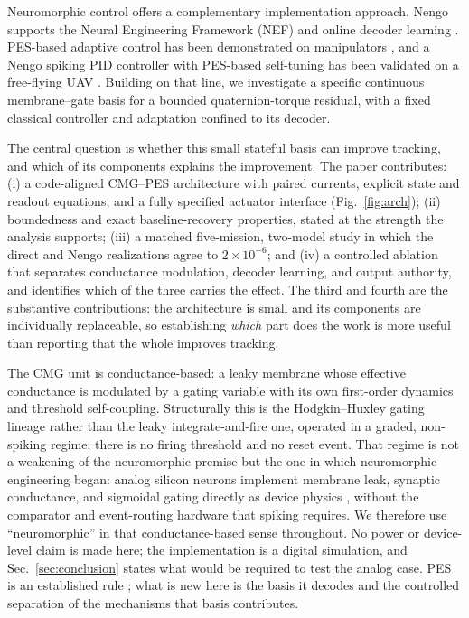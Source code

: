 \documentclass[letterpaper,10pt,conference]{IEEEtran}
\begin{document}
Neuromorphic control offers a complementary implementation approach.
Nengo supports the Neural Engineering Framework (NEF) and online decoder
learning \cite{bekolay2014nengo}. PES-based adaptive control has been
demonstrated on manipulators \cite{dewolf2016arm,dewolf2020nengo}, and a
Nengo spiking PID controller with PES-based self-tuning has been validated
on a free-flying UAV \cite{olivares2026selftuning}. Building on that line, we
investigate a specific continuous membrane--gate basis for a bounded
quaternion-torque residual, with a fixed classical controller and adaptation
confined to its decoder.

The central question is whether this small stateful basis can improve
tracking, and which of its components explains the improvement. The paper
contributes: (i) a code-aligned CMG--PES architecture with paired currents,
explicit state and readout equations, and a fully specified actuator
interface (Fig.~\ref{fig:arch}); (ii) boundedness and exact
baseline-recovery properties, stated at the strength the analysis supports;
(iii) a matched five-mission, two-model study in which the direct and Nengo
realizations agree to $2\times10^{-6}$; and (iv) a controlled ablation that
separates conductance modulation, decoder learning, and output authority,
and identifies which of the three carries the effect. The third and fourth
are the substantive contributions: the architecture is small and its
components are individually replaceable, so establishing \emph{which} part
does the work is more useful than reporting that the whole improves
tracking.

The CMG unit is conductance-based: a leaky membrane whose effective
conductance is modulated by a gating variable with its own first-order
dynamics and threshold self-coupling. Structurally this is the
Hodgkin--Huxley gating lineage rather than the leaky integrate-and-fire one,
operated in a graded, non-spiking regime; there is no firing threshold and
no reset event. That regime is not a weakening of the neuromorphic premise
but the one in which neuromorphic engineering began: analog silicon neurons
implement membrane leak, synaptic conductance, and sigmoidal gating directly
as device physics \cite{mahowald1991vlsi}, without the comparator and
event-routing hardware that spiking requires. We therefore use
``neuromorphic'' in that conductance-based sense throughout. No power or
device-level claim is made here; the implementation is a digital simulation,
and Sec.~\ref{sec:conclusion} states what would be required to test the
analog case. PES is an established rule \cite{voelker2015pes}; what is new
here is the basis it decodes and the controlled separation of the mechanisms
that basis contributes.
\end{document}
